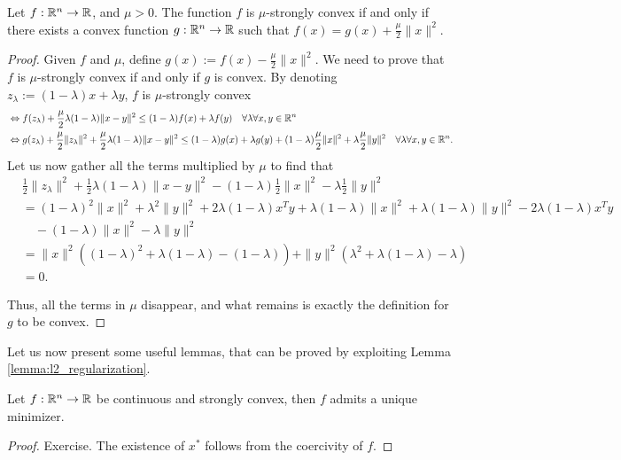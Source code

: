 \documentclass[10pt,a4paper]{article}
\begin{document}
\begin{lemma}\label{lemma:l2_regularization}
	Let $f : \mathbb{R}^n \to \mathbb{R}$, and $\mu > 0$. The function $f$ is $\mu$-strongly convex if and only if there exists a convex function $g : \mathbb{R}^n \to \mathbb{R}$ such that $f(x) = g(x) + \frac{\mu}{2}\|x\|^2$.
\end{lemma} 
\begin{proof}
	Given $f$ and $\mu$, define $g(x) := f(x) - \frac{\mu}{2}\|x\|^2$. We need to prove that $f$ is $\mu$-strongly convex if and only if $g$ is convex. By denoting $z_\lambda := (1-\lambda)x + \lambda y$,  $f$ is $\mu$-strongly convex
	\begin{align*}
		&\Leftrightarrow f(z_\lambda) + \frac{\mu}{2}\lambda(1-\lambda)\|x - y\|^2 \leq (1-\lambda)f(x) + \lambda f(y) \quad \forall \lambda \forall x, y\in \mathbb{R}^n \\
		&\Leftrightarrow g(z_\lambda) + \frac{\mu}{2}\|z_\lambda\|^2 + \frac{\mu}{2}\lambda(1-\lambda)\|x - y\|^2 \leq (1-\lambda)g(x) + \lambda g(y) + (1-\lambda)\frac{\mu}{2}\|x\|^2 + \lambda\frac{\mu}{2}\|y\|^2 \quad \forall \lambda \forall x, y\in \mathbb{R}^n.
	\end{align*}
	Let us now gather all the terms multiplied by $\mu$ to find that
	\begin{align*}
		&\frac{1}{2}\|z_\lambda\|^2 + \frac{1}{2}\lambda(1-\lambda)\|x - y\|^2 - (1-\lambda)\frac{1}{2}\|x\|^2 - \lambda\frac{1}{2}\|y\|^2 \\
		&= (1-\lambda)^2\|x\|^2 + \lambda^2\|y\|^2 + 2\lambda(1-\lambda) x^Ty + \lambda(1-\lambda)\|x\|^2 + \lambda(1-\lambda)\|y\|^2 - 2\lambda(1-\lambda) x^Ty\\
		&\quad - (1-\lambda)\|x\|^2 - \lambda\|y\|^2 \\
		&= \|x\|^2\left((1-\lambda)^2 + \lambda(1-\lambda) - (1-\lambda)\right) + \|y\|^2\left(\lambda^2 + \lambda(1-\lambda) - \lambda\right) \\
		&= 0.
	\end{align*}
	
	\noindent Thus, all the terms in $\mu$ disappear, and what remains is exactly the definition for $g$ to be convex.
\end{proof}

\noindent Let us now present some useful lemmas, that can be proved by exploiting Lemma \ref{lemma:l2_regularization}.
\begin{lemma}
	Let $f : \mathbb{R}^n \to \mathbb{R}$ be continuous and strongly convex, then $f$ admits a unique minimizer.
\end{lemma}
\begin{proof}
	Exercise. The existence of $x^*$ follows from the coercivity of $f$.
\end{proof}
\end{document}
